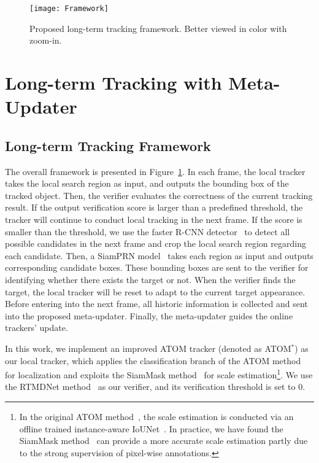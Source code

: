 \documentclass[10pt,twocolumn,letterpaper]{article}
\begin{document}
\begin{figure}[h]
	\begin{center}
		\texttt{[image: Framework]}
	\end{center}
	\vspace{-4mm}
	\caption{Proposed long-term tracking framework. Better viewed in color with zoom-in.}
	\label{fig:framework}
	\vspace{-6mm}
\end{figure}
\section{Long-term Tracking with Meta-Updater}
\vspace{-2mm}
\subsection{Long-term Tracking Framework}
\vspace{-2mm}
The overall framework is presented in Figure~\ref{fig:framework}.
In each frame, the local tracker takes the local search region as input, and outputs
the bounding box of the tracked object.
Then, the verifier evaluates the correctness of the current tracking result.
If the output verification score is larger than a predefined threshold, the tracker will continue to
conduct local tracking in the next frame.
If the score is smaller than the threshold, we use the faster R-CNN detector~\cite{mmdetection} to
detect all possible candidates in the next frame and crop the local search region regarding each candidate.
Then, a SiamPRN model~\cite{Zhang-VOT18-MBMD} takes each region as input and outputs corresponding candidate boxes.
These bounding boxes are sent to the verifier for identifying whether there exists the target or not.
When the verifier finds the target, the local tracker will be reset to adapt to the current target appearance.
Before entering into the next frame, all historic information is collected and sent into the proposed
meta-updater.
Finally, the meta-updater guides the online trackers' update.

In this work, we implement an improved ATOM tracker (denoted as ATOM$^*$)
as our local tracker, which applies the classification branch of the
ATOM method~\cite{Danelljan-CVPR19-ATOM}  for localization and exploits
the SiamMask method~\cite{Wang-CVPR19-SiamMask} for scale
estimation\footnote{In the original ATOM method~\cite{Danelljan-CVPR19-ATOM},
the scale estimation is conducted via an offline trained instance-aware
IoUNet~\cite{Jiang-ECCV18-IoUNet}. In practice, we have found the SiamMask
method~\cite{Wang-CVPR19-SiamMask} can provide a more accurate scale
estimation partly due to the strong supervision of pixel-wise annotations.}.
We use the RTMDNet method~\cite{RTMDNet} as our verifier, and its verification
threshold is set to 0.
\end{document}
